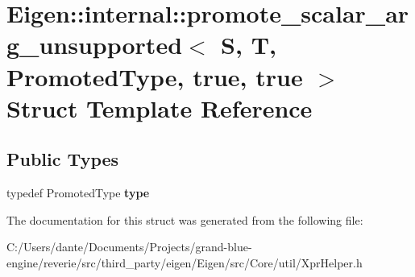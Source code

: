 \hypertarget{struct_eigen_1_1internal_1_1promote__scalar__arg__unsupported_3_01_s_00_01_t_00_01_promoted_type_00_01true_00_01true_01_4}{}\section{Eigen\+::internal\+::promote\+\_\+scalar\+\_\+arg\+\_\+unsupported$<$ S, T, Promoted\+Type, true, true $>$ Struct Template Reference}
\label{struct_eigen_1_1internal_1_1promote__scalar__arg__unsupported_3_01_s_00_01_t_00_01_promoted_type_00_01true_00_01true_01_4}
\subsection*{Public Types}
\begin{DoxyCompactItemize}
\item 
\mbox{\label{struct_eigen_1_1internal_1_1promote__scalar__arg__unsupported_3_01_s_00_01_t_00_01_promoted_type_00_01true_00_01true_01_4_a64364a92b21177220b54217e88f1703d}} 
typedef Promoted\+Type {\bfseries type}
\end{DoxyCompactItemize}


The documentation for this struct was generated from the following file\+:\begin{DoxyCompactItemize}
\item 
C\+:/\+Users/dante/\+Documents/\+Projects/grand-\/blue-\/engine/reverie/src/third\+\_\+party/eigen/\+Eigen/src/\+Core/util/Xpr\+Helper.\+h\end{DoxyCompactItemize}
